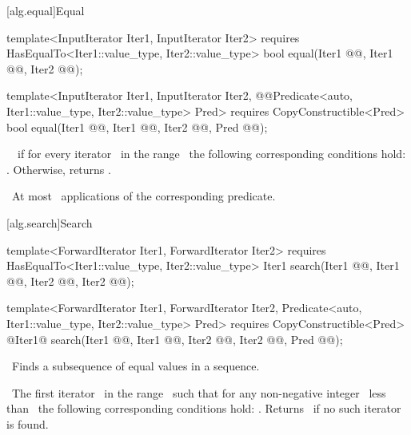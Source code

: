 \documentclass[american,twoside]{book}
\newcommand{\resetcolor}{\textcolor{addclr}{}}
\begin{document}
\begin{paras}
[alg.equal]{Equal}

%
\color{addclr}\begin{itemdecl}
template<InputIterator Iter1, InputIterator Iter2>
  requires HasEqualTo<Iter1::value_type, Iter2::value_type>
  bool equal(Iter1 @@, Iter1 @@,
             Iter2 @@);

template<InputIterator Iter1, InputIterator Iter2,
         @\resetcolor{}@Predicate<auto, Iter1::value_type, Iter2::value_type> Pred>
  requires CopyConstructible<Pred>
  bool equal(Iter1 @@, Iter1 @@,
             Iter2 @@, Pred @@);
\end{itemdecl}\color{black}

\begin{itemdescr}
\pnum
\returns\ 
\
if for every iterator
\
in the range \
the following corresponding conditions hold:
.
Otherwise, returns
\tcode{false}.

\pnum
\complexity\ 
At most
\
applications of the corresponding predicate.
\end{itemdescr}

\rSec2[alg.search]{Search}

\index{search@\tcode{search}}%
\color{addclr}\begin{itemdecl}
template<ForwardIterator Iter1, ForwardIterator Iter2>
  requires HasEqualTo<Iter1::value_type, Iter2::value_type>
  Iter1 search(Iter1 @@, Iter1 @@,
               Iter2 @@, Iter2 @@);

template<ForwardIterator Iter1, ForwardIterator Iter2,
         Predicate<auto, Iter1::value_type, Iter2::value_type> Pred>
  requires CopyConstructible<Pred>
  @\textcolor{addclr}{Iter1}@ search(Iter1 @\farg{first1}@, Iter1 @@,
               Iter2 @\farg{first2}@, Iter2 @\farg{last2}@,
               Pred @@);
\end{itemdecl}\color{black}

\begin{itemdescr}
\pnum
\effects\ 
Finds a subsequence of equal values in a sequence.

\pnum
\returns\ 
The first iterator
\tcode{i}\
in the range \
such that for any non-negative integer
\
less than
\
the following corresponding conditions hold:
.
Returns \
if no such iterator is found.


\end{itemdescr}
\end{paras}
\end{document}
